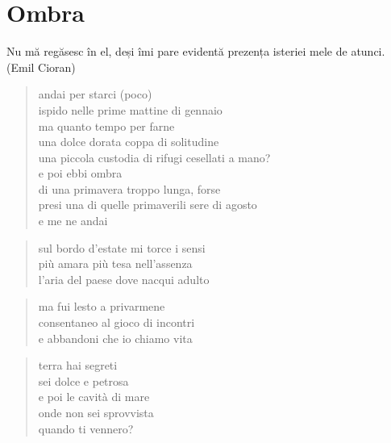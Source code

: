 \chapter{Ombra}

\begin{otherlanguage}{romanian}
    Nu mă regăsesc în el, deşi îmi pare evidentă prezenţa isteriei mele de atunci. (Emil Cioran)
\end{otherlanguage}


\begin{verse}
    andai per starci (poco)\\
    ispido nelle prime mattine di gennaio\\
    ma quanto tempo per farne\\
    una dolce dorata coppa di solitudine\\
    una piccola custodia di rifugi cesellati a mano?\\
    e poi ebbi ombra\\
    di una primavera troppo lunga, forse\\
    presi una di quelle primaverili sere di agosto\\
    e me ne andai
\end{verse}

\clearpage


\begin{verse}
    sul bordo d'estate mi torce i sensi\\
    più amara più tesa nell'assenza\\
    l'aria del paese dove nacqui adulto
\end{verse}

\begin{verse}
    ma fui lesto a privarmene\\
    consentaneo al gioco di incontri\\
    e abbandoni che io chiamo vita
\end{verse}

\clearpage


\begin{verse}
    terra hai segreti\\
    sei dolce e petrosa\\
    e poi le cavità di mare\\
    onde non sei sprovvista\\
    quando ti vennero?
\end{verse}

